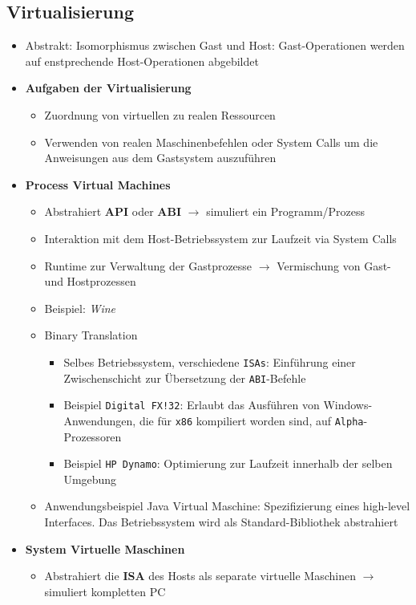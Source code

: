 \subsection{Virtualisierung}
\begin{itemize}
	\item Abstrakt: Isomorphismus zwischen Gast und Host: Gast-Operationen werden auf enstprechende Host-Operationen abgebildet
	\item \textbf{Aufgaben der Virtualisierung}
	\begin{itemize}
		\item Zuordnung von virtuellen zu realen Ressourcen
		\item Verwenden von realen Maschinenbefehlen oder System Calls um die Anweisungen aus dem Gastsystem auszuführen
	\end{itemize}
	\item \textbf{Process Virtual Machines}
	\begin{itemize}
		\item Abstrahiert \textbf{API} oder \textbf{ABI} \(\rightarrow\) simuliert ein Programm/Prozess
		\item Interaktion mit dem Host-Betriebssystem zur Laufzeit via System Calls
		\item Runtime zur Verwaltung der Gastprozesse \(\rightarrow\) Vermischung von Gast- und Hostprozessen
		\item Beispiel: \textit{Wine}
		\item Binary Translation
		\begin{itemize}
			\item Selbes Betriebssystem, verschiedene \texttt{ISAs}: Einführung einer Zwischenschicht zur Übersetzung der \texttt{ABI}-Befehle
			\item Beispiel \texttt{Digital FX!32}: Erlaubt das Ausführen von Windows-Anwendungen, die für \texttt{x86} kompiliert worden sind, auf \texttt{Alpha}-Prozessoren
			\item Beispiel \texttt{HP Dynamo}: Optimierung zur Laufzeit innerhalb der selben Umgebung
		\end{itemize}
		\item Anwendungsbeispiel Java Virtual Maschine: Spezifizierung eines high-level Interfaces. Das Betriebssystem wird als Standard-Bibliothek abstrahiert
	\end{itemize}
	\item \textbf{System Virtuelle Maschinen}
	\begin{itemize}
		\item Abstrahiert die \textbf{ISA} des Hosts als separate virtuelle Maschinen \(\rightarrow\) simuliert kompletten PC

\end{itemize}
\end{itemize}
